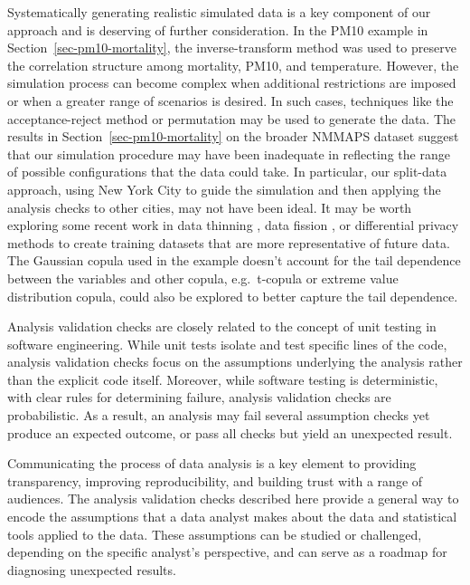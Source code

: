 \documentclass[
  12pt,
]{interact}
\begin{document}
Systematically generating realistic simulated data is a key component of
our approach and is deserving of further consideration. In the PM10
example in Section~\ref{sec-pm10-mortality}, the inverse-transform
method was used to preserve the correlation structure among mortality,
PM10, and temperature. However, the simulation process can become
complex when additional restrictions are imposed or when a greater range
of scenarios is desired. In such cases, techniques like the
acceptance-reject method or permutation may be used to generate the
data. The results in Section~\ref{sec-pm10-mortality} on the broader
NMMAPS dataset suggest that our simulation procedure may have been
inadequate in reflecting the range of possible configurations that the
data could take. In particular, our split-data approach, using New York
City to guide the simulation and then applying the analysis checks to
other cities, may not have been ideal. It may be worth exploring some
recent work in data thinning \citep{neufeld2024data}, data fission
\citep{leiner2023data}, or differential privacy methods
\citep{dong_gaussian_2022} to create training datasets that are more
representative of future data. The Gaussian copula used in the example
doesn't account for the tail dependence between the variables and other
copula, e.g.~t-copula or extreme value distribution copula, could also
be explored to better capture the tail dependence.

Analysis validation checks are closely related to the concept of unit
testing in software engineering. While unit tests isolate and test
specific lines of the code, analysis validation checks focus on the
assumptions underlying the analysis rather than the explicit code
itself. Moreover, while software testing is deterministic, with clear
rules for determining failure, analysis validation checks are
probabilistic. As a result, an analysis may fail several assumption
checks yet produce an expected outcome, or pass all checks but yield an
unexpected result.

Communicating the process of data analysis is a key element to providing
transparency, improving reproducibility, and building trust with a range
of audiences. The analysis validation checks described here provide a
general way to encode the assumptions that a data analyst makes about
the data and statistical tools applied to the data. These assumptions
can be studied or challenged, depending on the specific analyst's
perspective, and can serve as a roadmap for diagnosing unexpected
results.
\end{document}
